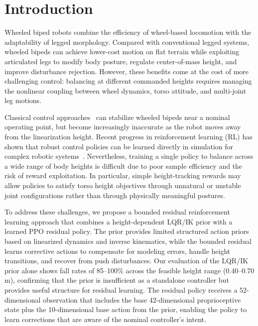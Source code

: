 \documentclass[conference]{IEEEtran}
\begin{document}
\section{Introduction}
Wheeled biped robots combine the efficiency of wheel-based locomotion with
the adaptability of legged morphology.
Compared with conventional legged systems, wheeled bipeds can achieve
lower-cost motion on flat terrain while exploiting articulated legs to modify
body posture, regulate center-of-mass height, and improve disturbance rejection.
However, these benefits come at the cost of more challenging control:
balancing at different commanded heights requires managing the nonlinear
coupling between wheel dynamics, torso attitude, and multi-joint leg motions.

Classical control approaches~\cite{klemm2020lqrwbc} can stabilize wheeled bipeds
near a nominal operating point, but become increasingly inaccurate as the
robot moves away from the linearization height.
Recent progress in reinforcement learning (RL) has shown that robust control
policies can be learned directly in simulation for complex robotic
systems~\cite{hwangbo2019learning,lee2020learning,rudin2022walk}.
Nevertheless, training a single policy to balance across a wide range of
body heights is difficult due to poor sample efficiency and the risk of
reward exploitation.
In particular, simple height-tracking rewards may allow policies to satisfy
torso height objectives through unnatural or unstable joint configurations
rather than through physically meaningful postures.

To address these challenges, we propose a bounded residual reinforcement learning
approach that combines a height-dependent LQR/IK prior with a learned PPO residual policy.
The prior provides limited structured action priors based on linearized dynamics
and inverse kinematics, while the bounded residual learns corrective actions to
compensate for modeling errors, handle height transitions, and recover from push disturbances.
Our evaluation of the LQR/IK prior alone shows fall rates of 85--100\% across the
feasible height range (0.40--0.70\,m), confirming that the prior is insufficient as
a standalone controller but provides useful structure for residual learning.
The residual policy receives a 52-dimensional observation that includes the base
42-dimensional proprioceptive state plus the 10-dimensional base action from the prior,
enabling the policy to learn corrections that are aware of the nominal controller's intent.
\end{document}
